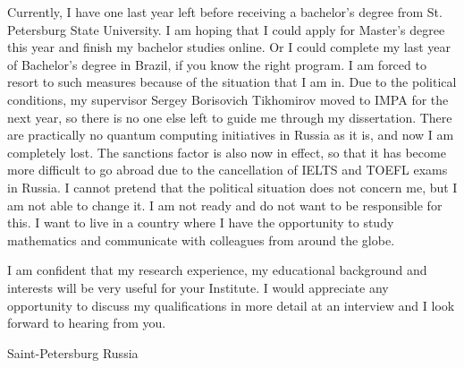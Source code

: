 \documentclass[11pt,a4paper,sans]{moderncv}        %
\begin{document}
	Currently, I have one last year left before receiving a bachelor's degree from St. Petersburg State University. I am hoping that I could apply for Master's degree this year and finish my bachelor studies online. Or I could complete my last year of Bachelor's degree in Brazil, if you know the right program. I am forced to resort to such measures because of the situation that I am in. Due to the political conditions, my supervisor Sergey Borisovich Tikhomirov moved to IMPA for the next year, so there is no one else left to guide me through my dissertation. There are practically no quantum computing initiatives in Russia as it is, and now I am completely lost. The sanctions factor is also now in effect, so that it has become more difficult to go abroad due to the cancellation of IELTS and TOEFL exams in Russia. I cannot pretend that the political situation does not concern me, but I am not able to change it. I am not ready and do not want to be responsible for this. I want to live in a country where I have the opportunity to study mathematics and communicate with colleagues from around the globe.
	
	I am confident that my research experience, my educational background and interests will be very useful for your Institute. I would appreciate any opportunity to discuss my qualifications in more detail at an interview and I look forward to hearing from you.
	
	\vspace*{\fill}
	\title{}
	\address{Novoizmailovsky prospect, 16k8}{Saint-Petersburg}{ Russia }
	\makeletterclosing
	\name{}{}
\end{document}
